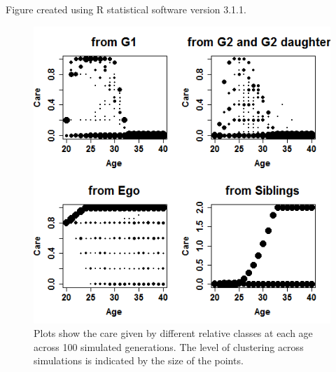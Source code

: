 \documentclass[10pt]{article}
\begin{document}
Figure created using R statistical software version 3.1.1.

\begin{figure}[!ht]
  \includegraphics[width=1\textwidth]{Fig3.png}

\caption{Plots show the care given by different relative classes at each age across 100 simulated generations.  The level of clustering across simulations is indicated by the size of the points.}
\label{fig:simputs}

\end{figure}
\end{document}
